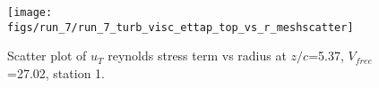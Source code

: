 \begin{figure}[H]
\centering
\texttt{[image: figs/run\_7/run\_7\_turb\_visc\_ettap\_top\_vs\_r\_meshscatter]}
\caption{Scatter plot of $
u_T$ reynolds stress term vs radius at $z/c$=5.37, $V_{free}$=27.02, station 1.}
\label{fig:run_7_turb_visc_ettap_top_vs_r_meshscatter}
\end{figure}


